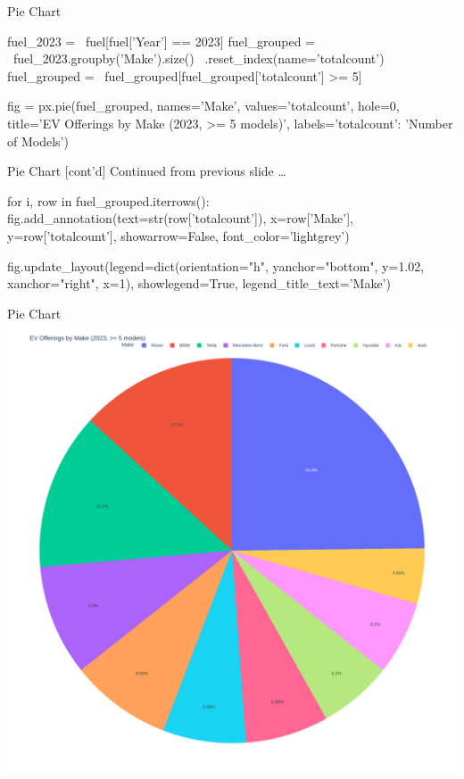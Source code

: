 \documentclass[ignorenonframetext,xcolor=x11names]{beamer}
\begin{document}
\begin{frame}[fragile]{Pie Chart}
\footnotesize
\begin{pythoncode}
fuel_2023 = \
    fuel[fuel['Year'] == 2023]
fuel_grouped = \
    fuel_2023.groupby('Make').size() \
    .reset_index(name='totalcount')
fuel_grouped = \
    fuel_grouped[fuel_grouped['totalcount'] >= 5]

fig = px.pie(fuel_grouped, 
    names='Make', values='totalcount', hole=0,
    title='EV Offerings by Make (2023, >= 5 models)',
    labels={'totalcount': 'Number of Models'})
\end{pythoncode}
\end{frame}

\begin{frame}[fragile]{Pie Chart \small [cont'd]}
Continued from previous slide \ldots
\footnotesize
\begin{pythoncode}
for i, row in fuel_grouped.iterrows():
    fig.add_annotation(text=str(row['totalcount']),
            x=row['Make'], y=row['totalcount'], 
            showarrow=False, font_color='lightgrey')

fig.update_layout(legend=dict(orientation="h", yanchor="bottom", 
    y=1.02, xanchor="right", x=1),
    showlegend=True, legend_title_text='Make')
\end{pythoncode}
\end{frame}

\begin{frame}{Pie Chart}
\centering
  \includegraphics[width=.8\textwidth]{px.fuel.pie.pdf}
\end{frame}
\end{document}

